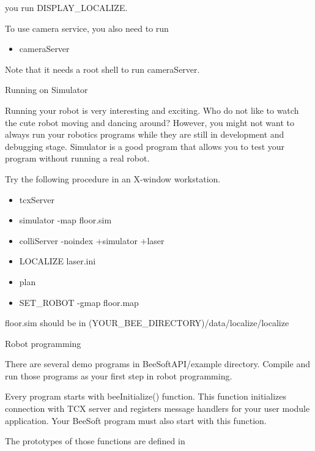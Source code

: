 you run DISPLAY\_LOCALIZE.\par \par To use camera service, you also
need to run\par \begin{itemize}\item cameraServer  
\end{itemize}\par Note that it needs a root shell to run
cameraServer.\par \par Running on Simulator\par \par Running your
robot is very interesting and exciting. Who do not like to watch the
cute robot moving and dancing around? However, you might not want to
always run your robotics programs while they are still in development
and debugging stage. Simulator is a good program that allows you to
test your program without running a real robot.\par \par Try the
following procedure in an X-window workstation.\par
\begin{itemize}\item tcxServer\item
  simulator -map floor.sim\item  colliServer -noindex +simulator +laser\item LOCALIZE laser.ini\item plan\item SET\_ROBOT -gmap floor.map 
\end{itemize}\par floor.sim should be in
(YOUR\_BEE\_DIRECTORY)/data/localize/localize\par \par Robot
programming\par \par There are several demo programs in
BeeSoftAPI/example directory. Compile and run those programs as your
first step in robot programming.\par \par Every program starts with
beeInitialize() function. This function initializes connection with
TCX server and registers message handlers for your user module
application. Your BeeSoft program must also start with this
function.\par \par The prototypes of those functions are defined in
